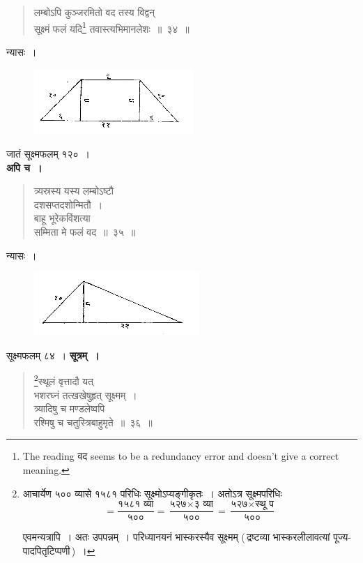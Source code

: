 \documentclass[11pt, openany]{book}
\begin{document}
\newpage
\begin{quote}
    \bqt 
 लम्बोऽपि कुञ्जरमितो वद तस्य विद्वन् \\
 सूक्ष्मं फलं यदि\footnote{The reading वद seems to be a redundancy error and doesn't give a correct meaning.} तवास्त्यभिमानलेशः~॥~३४~॥
\end{quote}

 न्यासः~। 
 \vspace{-2mm}
\begin{figure}[h!]
    \centering
    \includegraphics[scale=0.8]{graphics/capture42.png}
\end{figure}
 \vspace{-2mm}

 जातं सूक्ष्मफलम् १२०~। \\

\vspace{-2mm}
 \textbf{अपि च~।} 
\begin{quote}
    \bqt
     त्र्यस्रस्य यस्य लम्बोऽष्टौ \\
     दशसप्तदशोन्मितौ~।\\
बाहू भूरेकविंशत्या \\
सम्मिता मे फलं वद~॥~३५~॥
\end{quote}

 न्यासः~। 
\vspace{-2mm}
\begin{figure}[h!]
    \centering
    \includegraphics[scale=0.8]{graphics/capture43.png}
\end{figure}
\vspace{-2mm}

 सूक्ष्मफलम् ८४~। 
\newpage
\setcounter{footnote}{0}
 \textbf{सूत्रम्~।} 
\begin{quote}
    \bs 
     \footnote{आचार्येण ५०० व्यासे १५८१ परिधिः सूक्ष्मोऽप्यङ्गीकृतः~। 
अतोऽत्र सूक्ष्मपरिधिः 
\begin{equation*}
     = \dfrac{\mbox{१५८१ व्या}}{\mbox{५००}} = \dfrac{\mbox{५२७} \times \mbox{३ व्या}}{\mbox{५००}} = \dfrac{\mbox{५२७} \times \mbox{स्थू प}}{\mbox{५००}}
\end{equation*}

\hspace{2mm} एवमन्यत्रापि~। अतः उपपन्नम्~। परिध्यानयनं भास्करस्यैव
सूक्ष्मम् (\,द्रष्टव्या भास्करलीलावत्यां पूज्य-पादपितृटिप्पणी\,)~। }स्थूलं वृत्तादौ यत् \\
भशरघ्नं तत्खखेषुहृत् सूक्ष्मम्~।\\
त्र्यादिषु च मण्डलेष्वपि \\
रश्मिषु च चतुस्त्रिबाहुमृते~॥~३६~॥
\end{quote}
\end{document}
